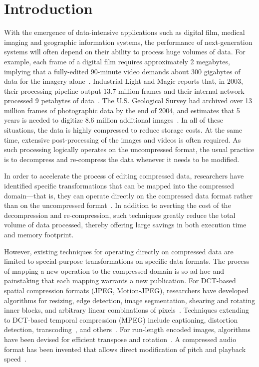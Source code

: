 \section{Introduction}

With the emergence of data-intensive applications such as digital
film, medical imaging and geographic information systems, the
performance of next-generation systems will often depend on their
ability to process huge volumes of data.  For example, each frame of a
digital film requires approximately 2 megabytes, implying that a
fully-edited 90-minute video demands about 300 gigabytes of data for
the imagery alone~\cite{ibm-video}.  Industrial Light and Magic
reports that, in 2003, their processing pipeline output 13.7 million
frames and their internal network processed 9 petabytes of
data~\cite{ilm-interview}.  The U.S. Geological Survey had archived
over 13 million frames of photographic data by the end of 2004, and
estimates that 5 years is needed to digitize 8.6 million additional
images~\cite{usgs}.  In all of these situations, the data is highly
compressed to reduce storage costs.  At the same time, extensive
post-processing of the images and videos is often required.  As such
processing logically operates on the uncompressed format, the usual
practice is to decompress and re-compress the data whenever it needs
to be modified.

In order to accelerate the process of editing compressed data,
researchers have identified specific transformations that can be
mapped into the compressed domain---that is, they can operate directly
on the compressed data format rather than on the uncompressed
format~\cite{surveys-folder}.  In addition to averting the cost of the
decompression and re-compression, such techniques greatly reduce the
total volume of data processed, thereby offering large savings in both
execution time and memory footprint.

However, existing techniques for operating directly on compressed data
are limited to special-purpose transformations on specific data
formats.  The process of mapping a new operation to the compressed
domain is so ad-hoc and painstaking that each mapping warrants a new
publication.  For DCT-based spatial compression formats (JPEG,
Motion-JPEG), researchers have developed algorithms for
resizing\cite{image/dugad01,imag/mukerjee}, edge
detection\cite{11-shen,12-shen}, image
segmentation\cite{image/feng03}, shearing and rotating inner
blocks\cite{image/++shen98}, and arbitrary linear combinations of
pixels~\cite{smith98}.  Techniques extending to DCT-based temporal
compression (MPEG) include captioning\cite{video/nang00}, distortion
detection\cite{video/dorai99}, transcoding~\cite{video/smith98}, and
others~\cite{surveys/wee02}.  For run-length encoded images,
algorithms have been devised for efficient transpose and
rotation~\cite{shoji95,images/99-misra}.  A compressed audio format
has been invented that allows direct modification of pitch and
playback speed~\cite{audio/levine}.

